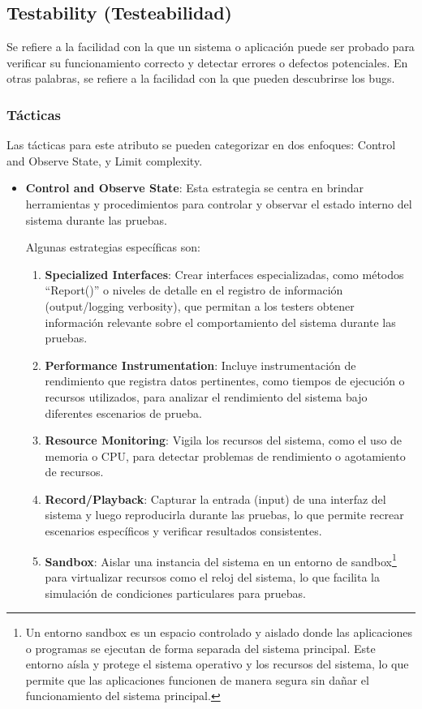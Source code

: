 \documentclass{article}
\begin{document}
		
		\subsection{Testability \small{(Testeabilidad)}}
		Se refiere a la facilidad con la que un sistema o aplicación puede ser probado para verificar su funcionamiento correcto y detectar errores o defectos potenciales. En otras palabras, se refiere a la facilidad con la que pueden descubrirse los bugs.
		\subsubsection{Tácticas}
		Las tácticas para este atributo se pueden categorizar en dos enfoques: Control and Observe State, y Limit complexity. 
		
		
		\begin{itemize}		
			\item \textbf{Control and Observe State}:
			Esta estrategia se centra en brindar herramientas y procedimientos para controlar y observar el estado interno del sistema durante las pruebas. 
			
			Algunas estrategias específicas son:
			\begin{enumerate}
				\item \textbf{Specialized Interfaces}: Crear interfaces especializadas, como métodos ``Report()'' o niveles de detalle en el registro de información (output/logging verbosity), que permitan a los testers obtener información relevante sobre el comportamiento del sistema durante las pruebas.

				\item \textbf{Performance Instrumentation}: Incluye instrumentación de rendimiento que registra datos pertinentes, como tiempos de ejecución o recursos utilizados, para analizar el rendimiento del sistema bajo diferentes escenarios de prueba.
				
				
				\item \textbf{Resource Monitoring}: Vigila los recursos del sistema, como el uso de memoria o CPU, para detectar problemas de rendimiento o agotamiento de recursos.
				
				\item \textbf{Record/Playback}: Capturar la entrada (input) de una interfaz del sistema y luego reproducirla durante las pruebas, lo que permite recrear escenarios específicos y verificar resultados consistentes.
				
				\item \textbf{Sandbox}: Aislar una instancia del sistema en un entorno de sandbox\footnote{Un entorno sandbox es un espacio controlado y aislado donde las aplicaciones o programas se ejecutan de forma separada del sistema principal. Este entorno aísla y protege el sistema operativo y los recursos del sistema, lo que permite que las aplicaciones funcionen de manera segura sin dañar el funcionamiento del sistema principal.} para virtualizar recursos como el reloj del sistema, lo que facilita la simulación de condiciones particulares para pruebas.
				

\end{enumerate}
\end{itemize}
\end{document}
